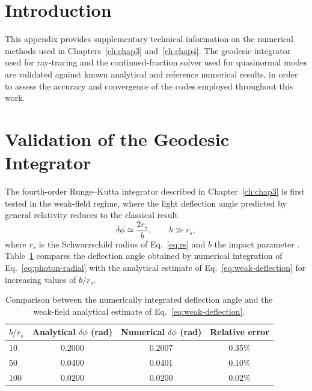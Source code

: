
	\cleardoublepage
	
	\setcounter{chapter}{1} %
	\setcounter{figure}{0}
	\setcounter{table}{0}
	
	\label{ann:A}
	
	\AppendixHeader
	
	\section*{Introduction}
	
	This appendix provides supplementary technical information on the numerical methods used in Chapters~\ref{ch:chap3} and~\ref{ch:chap4}. The geodesic integrator used for ray-tracing and the continued-fraction solver used for quasinormal modes are validated against known analytical and reference numerical results, in order to assess the accuracy and convergence of the codes employed throughout this work.
	
	\section*{Validation of the Geodesic Integrator}
	
	The fourth-order Runge--Kutta integrator described in Chapter~\ref{ch:chap3} is first tested in the weak-field regime, where the light deflection angle predicted by general relativity reduces to the classical result
	\begin{equation}
		\delta\phi \simeq \frac{2 r_s}{b}, \qquad b \gg r_s,
		\label{eq:weak-deflection}
	\end{equation}
	where $r_s$ is the Schwarzschild radius of Eq.~\eqref{eq:rs} and $b$ the impact parameter \cite{einstein1916}. Table~\ref{tab:deflection-validation} compares the deflection angle obtained by numerical integration of Eq.~\eqref{eq:photon-radial} with the analytical estimate of Eq.~\eqref{eq:weak-deflection} for increasing values of $b/r_s$.
	
	\begin{table}[H]
		\centering
		\caption{Comparison between the numerically integrated deflection angle and the weak-field analytical estimate of Eq.~\eqref{eq:weak-deflection}.}
		\label{tab:deflection-validation}
		\begin{tabular}{lccc}
			\hline
			\textbf{$b/r_s$} & \textbf{Analytical $\delta\phi$ (rad)} & \textbf{Numerical $\delta\phi$ (rad)} & \textbf{Relative error} \\
			\hline
			$10$ & $0.2000$ & $0.2007$ & $0.35\%$ \\
			$50$ & $0.0400$ & $0.0401$ & $0.10\%$ \\
			$100$ & $0.0200$ & $0.0200$ & $0.02\%$ \\
			\hline
		\end{tabular}
	\end{table}
	
